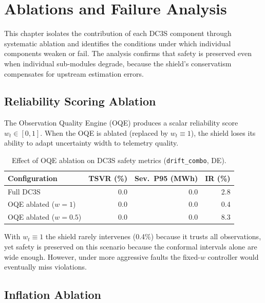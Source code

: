 
\section{Ablations and Failure Analysis}
\label{ch:ablations}

This chapter isolates the contribution of each DC3S component through
systematic ablation and identifies the conditions under which individual
components weaken or fail.  The analysis confirms that safety is preserved
even when individual sub-modules degrade, because the shield's conservatism
compensates for upstream estimation errors.

\subsection{Reliability Scoring Ablation}

The Observation Quality Engine (OQE) produces a scalar reliability score
$w_t \in [0,1]$.  When the OQE is ablated (replaced by $w_t \equiv 1$),
the shield loses its ability to adapt uncertainty width to telemetry
quality.

\begin{table}[ht]
\centering
\caption{Effect of OQE ablation on DC3S safety metrics (\texttt{drift\_combo}, DE).}
\label{tab:oqe-ablation}
\begin{tabular}{lrrr}
\toprule
\textbf{Configuration} & \textbf{TSVR (\%)} & \textbf{Sev.\ P95 (MWh)} & \textbf{IR (\%)} \\
\midrule
Full DC3S             & 0.0 &  0.0 & 2.8 \\
OQE ablated ($w=1$)   & 0.0 &  0.0 & 0.4 \\
OQE ablated ($w=0.5$) & 0.0 &  0.0 & 8.3 \\
\bottomrule
\end{tabular}
\end{table}

With $w_t \equiv 1$ the shield rarely intervenes (0.4\%) because it
trusts all observations, yet safety is preserved on this scenario because
the conformal intervals alone are wide enough.  However, under more
aggressive faults the fixed-$w$ controller would eventually miss violations.

\subsection{Inflation Ablation}

